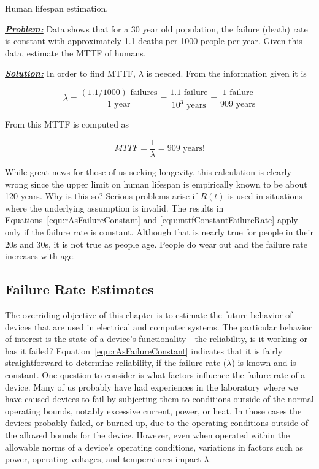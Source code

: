 {\begin{example}{Human lifespan estimation.}
\label{example:systemReliabilityHumanLifeSpan}

\emph{\textbf{\ul{Problem:}}} Data shows that for a 30 year old
population, the failure (death) rate is constant with approximately 1.1
deaths per 1000 people per year. Given this data, estimate the MTTF of
humans.

\emph{\textbf{\ul{Solution:}}} In order to find MTTF, $\lambda$ is 
needed. From the information given it is

$$\lambda = \frac{(1.1/1000) \text{ failures}}{1 \text{ year}} = \frac{1.1 \text{ failure}}{10^3 \text{ years}}=\frac{1 \text{ failure}}{909 \text{ years}}$$

From this MTTF is computed as

$$MTTF  = \frac{1}{\lambda} = 909 \text{ years!}$$
\end {example}


While great news for those of us seeking longevity, this calculation is
clearly wrong since the upper limit on human lifespan is empirically
known to be about 120 years. Why is this so? Serious problems arise if
$R(t)$ is used in situations where the underlying assumption is
invalid. The results in Equations~\ref{equ:rAsFailureConstant} and 
\ref{equ:mttfConstantFailureRate} apply only if the failure rate is
constant. Although that is nearly true for people in their 20s and 30s,
it is not true as people age. People do wear out and the failure rate
increases with age.

\subsection{Failure Rate Estimates}
\label{subsection:failure-rate-estimates}

The overriding objective of this chapter is to estimate the future
behavior of devices that are used in electrical and computer systems.
The particular behavior of interest is the state of a device's
functionality---the reliability, is it working or has it failed?
Equation~\ref{equ:rAsFailureConstant} indicates 
that it is fairly straightforward to determine
reliability, if the failure rate ($\lambda$) is known and is constant.
One question to consider is what factors influence the failure rate of a
device. Many of us probably have had experiences in the laboratory where
we have caused devices to fail by subjecting them to conditions outside
of the normal operating bounds, notably excessive current, power, or
heat. In those cases the devices probably failed, or burned up, due to
the operating conditions outside of the allowed bounds for the device.
However, even when operated within the allowable norms of a device's
operating conditions, variations in factors such as power, operating
voltages, and temperatures impact $\lambda$.

}
